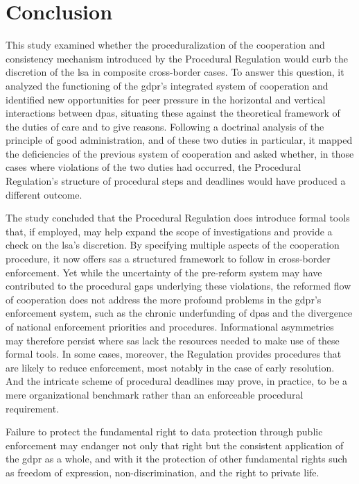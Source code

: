 \section{Conclusion}
\label{sec:ch7-conclusion}
This study examined whether the proceduralization of the cooperation and consistency mechanism introduced by the Procedural Regulation would curb the discretion of the \gls{lsa} in composite cross-border cases.
To answer this question, it analyzed the functioning of the \gls{gdpr}'s integrated system of cooperation and identified new opportunities for peer pressure in the horizontal and vertical interactions between \glspl{dpa}, situating these against the theoretical framework of the duties of care and to give reasons.
Following a doctrinal analysis of the principle of good administration, and of these two duties in particular, it mapped the deficiencies of the previous system of cooperation and asked whether, in those cases where violations of the two duties had occurred, the Procedural Regulation's structure of procedural steps and deadlines would have produced a different outcome.

The study concluded that the Procedural Regulation does introduce formal tools that, if employed, may help expand the scope of investigations and provide a check on the \gls{lsa}'s discretion.
By specifying multiple aspects of the cooperation procedure, it now offers \glspl{sa} a structured framework to follow in cross-border enforcement.
Yet while the uncertainty of the pre-reform system may have contributed to the procedural gaps underlying these violations, the reformed flow of cooperation does not address the more profound problems in the \gls{gdpr}'s enforcement system, such as the chronic underfunding of \glspl{dpa} and the divergence of national enforcement priorities and procedures.
Informational asymmetries may therefore persist where \glspl{sa} lack the resources needed to make use of these formal tools.
In some cases, moreover, the Regulation provides procedures that are likely to reduce enforcement, most notably in the case of early resolution.
And the intricate scheme of procedural deadlines may prove, in practice, to be a mere organizational benchmark rather than an enforceable procedural requirement.

Failure to protect the fundamental right to data protection through public enforcement may endanger not only that right but the consistent application of the \gls{gdpr} as a whole, and with it the protection of other fundamental rights such as freedom of expression, non-discrimination, and the right to private life.

